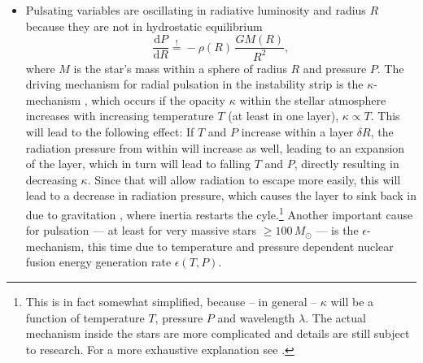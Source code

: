 \begin{itemize}
\item Pulsating variables are oscillating in radiative luminosity and radius $R$ because they are not in hydrostatic equilibrium
\begin{equation}
\label{eq:hydrostatic-equilibrium}
\frac{\mathrm{d}P}{\mathrm{d}R} \overset{!}= - \rho(R) \, \frac{G M(R)}{R^2},
\end{equation}
where $M$ is the star's mass within a sphere of radius $R$ and pressure $P$. The driving mechanism for radial pulsation in the instability strip is the $\kappa$-mechanism \citep{buchler1993}, which occurs if the opacity $\kappa$ within the stellar atmosphere increases with increasing temperature $T$ (at least in one layer), \ie $\kappa \propto T$. This will lead to the following effect: If $T$ and $P$ increase within a layer $\delta R$, the radiation pressure from within will increase as well, leading to an expansion of the layer, which in turn will lead to falling $T$ and $P$, directly resulting in decreasing $\kappa$. Since that will allow radiation to escape more easily, this will lead to a decrease in radiation pressure, which causes the layer to sink back in due to gravitation \citep{goodman2011}, where inertia restarts the cyle.\footnote{This is in fact somewhat simplified, because -- in general -- $\kappa$ will be a function of temperature $T$, pressure $P$ and wavelength $\lambda$. The actual mechanism inside the stars are more complicated and details are still subject to research. For a more exhaustive explanation see \citet{cox1980, percy2007}.} Another important cause for pulsation --- at least for very massive stars $\ge 100 \, \unit{M_\odot}$ \citep{buchler1993} --- is the $\epsilon$-mechanism, this time due to temperature and pressure dependent nuclear fusion energy generation rate $\epsilon(T, P)$.\\


\end{itemize}

